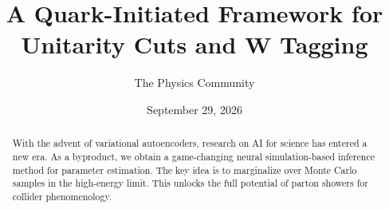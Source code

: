 \documentclass[11pt]{article}
\title{A Quark-Initiated Framework for Unitarity Cuts and W Tagging}
\author{The Physics Community}
\date{September 29, 2026}
\numberwithin{equation}{section}
\theoremstyle{definition}
\theoremstyle{remark}
\begin{document}
\maketitle
\begin{abstract}
With the advent of variational autoencoders, research on AI for science
has entered a new era. As a byproduct, we obtain a game-changing neural
simulation-based inference method for parameter estimation. The key idea
is to marginalize over Monte Carlo samples in the high-energy limit.
This unlocks the full potential of parton showers for collider
phenomenology.
\end{abstract}
\tableofcontents




\nocite{*}


\end{document}
